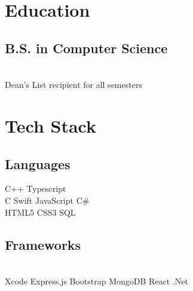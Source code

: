 \documentclass[]{rinkal_resume}
\begin{document}
%
%


%
%

\begin{minipage}[t]{0.30\textwidth} 


\section{Education} 

\subsection{B.S. in Computer Science}
\small {} \\
\small Dean's List recipient for all semesters
\sectionsep


\section{Tech Stack}
\subsection{Languages}
\vspace{1pt}
 \textbullet{} 
 \textbullet{}
C++ \textbullet{} 
Typescript \textbullet{} \\
C \textbullet{}
Swift \textbullet{} 
JavaScript \textbullet{} 
C\# \textbullet{} \\
HTML5 \textbullet{} 
CSS3 \textbullet{}
SQL \textbullet{}
\sectionsep

\vspace{1pt}
\subsection{Frameworks}
\vspace{1pt}
 \textbullet{}
 \textbullet{}
 \textbullet{} \\
Xcode \textbullet{}
Express.js \textbullet{}
Bootstrap \textbullet{}
MongoDB \textbullet{}
React \textbullet{}
.Net \textbullet{}
\sectionsep


\end{minipage}
\end{document}
